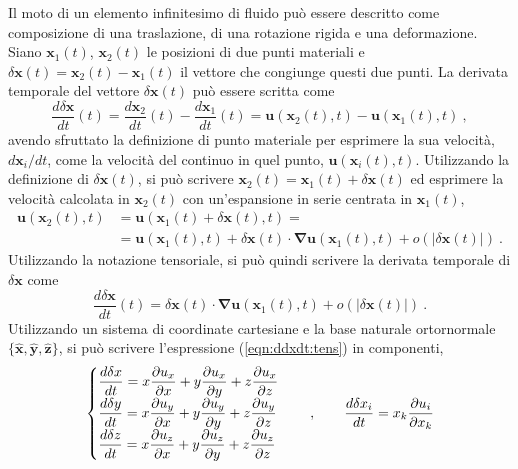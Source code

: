 
Il moto di un elemento infinitesimo di fluido può essere descritto come composizione di una traslazione, di una rotazione rigida e una deformazione.
Siano $\bm{x}_1(t)$, $\bm{x}_2(t)$ le posizioni di due punti materiali e $\delta\bm{x}(t) = \bm{x}_2(t) - \bm{x}_1(t)$ il vettore che congiunge questi due punti.
La derivata temporale del vettore $\delta \bm{x}(t)$ può essere scritta come
\begin{equation}
 \frac{d \delta\bm{x}}{d t}(t) =
  \frac{d \bm{x}_2}{d t}(t) - \frac{d \bm{x}_1}{d t}(t) = 
  \bm{u}(\bm{x}_2(t),t) - \bm{u}(\bm{x}_1(t),t) \ , 
\end{equation}
avendo sfruttato la definizione di punto materiale per esprimere la sua velocità,
$d \bm{x}_i/dt$, come la velocità del continuo in quel punto, $\bm{u}(\bm{x}_i(t),t)$.
\newline \noindent
Utilizzando la definizione di $\delta \bm{x}(t)$, si può scrivere $\bm{x}_2(t) = \bm{x}_1(t) + \delta \bm{x}(t)$ ed esprimere la velocità calcolata in $\bm{x}_2(t)$ con un'espansione in serie centrata in $\bm{x}_1(t)$,
\begin{equation}
\begin{aligned}
    \bm{u}(\bm{x}_2(t),t) & = \bm{u}(\bm{x}_1(t)+\delta\bm{x}(t),t) = \\
    & = \bm{u}(\bm{x}_1(t),t) + \delta\bm{x}(t) \cdot \bm{\nabla} \bm{u}(\bm{x}_1(t),t) +
    o(|\delta\bm{x}(t)|) \ .
\end{aligned}
\end{equation}
Utilizzando la notazione tensoriale, si può quindi scrivere la derivata temporale di $\delta \bm{x}$ come
\begin{equation}\label{eqn:ddxdt:tens}
 \frac{d \delta \bm{x}}{d t}(t) = \delta \bm{x}(t) \cdot \bm{\nabla}\bm{u}(\bm{x}_1(t),t) + o(|\delta\bm{x}(t)|) \ .
\end{equation}
Utilizzando un sistema di coordinate cartesiane e la base naturale ortornormale $\{ \bm{\hat{x}}, \bm{\hat{y}}, \bm{\hat{z}} \}$, si può scrivere l'espressione (\ref{eqn:ddxdt:tens}) in componenti,
\begin{equation}
\begin{cases}
 \dfrac{d \delta x}{d t} =  x \dfrac{\partial{u_x}}{\partial{x}} + y \dfrac{\partial{u_x}}{\partial{y}} + z \dfrac{\partial{u_x}}{\partial{z}} \\
 \dfrac{d \delta y}{d t} =  x \dfrac{\partial{u_y}}{\partial{x}} + y \dfrac{\partial{u_y}}{\partial{y}} + z \dfrac{\partial{u_y}}{\partial{z}} \\
 \dfrac{d \delta z}{d t} =  x \dfrac{\partial{u_z}}{\partial{x}} + y \dfrac{\partial{u_z}}{\partial{y}} + z \dfrac{\partial{u_z}}{\partial{z}} \\
\end{cases} \quad , \qquad 
 \dfrac{d \delta x_i}{d t} =  x_k \dfrac{\partial{u_i}}{\partial{x_k}} 
\end{equation}


